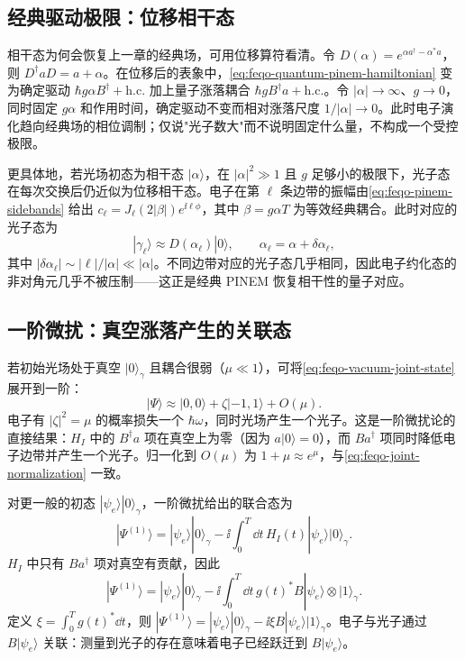 \subsection{经典驱动极限：位移相干态}

相干态为何会恢复上一章的经典场，可用位移算符看清。令 \(D(\alpha)=e^{\alpha a^\dagger-\alpha^*a}\)，则 \(D^\dagger aD=a+\alpha\)。在位移后的表象中，\cref{eq:feqo-quantum-pinem-hamiltonian} 变为确定驱动 \(\hbar g\alpha B^\dagger+\mathrm{h.c.}\) 加上量子涨落耦合 \(\hbar gB^\dagger a+\mathrm{h.c.}\)。令 \(|\alpha|\to\infty\)、\(g\to0\)，同时固定 \(g\alpha\) 和作用时间，确定驱动不变而相对涨落尺度 \(1/|\alpha|\to0\)。此时电子演化趋向经典场的相位调制；仅说"光子数大"而不说明固定什么量，不构成一个受控极限。

更具体地，若光场初态为相干态 \(|\alpha\rangle\)，在 \(|\alpha|^2\gg1\) 且 \(g\) 足够小的极限下，光子态在每次交换后仍近似为位移相干态。电子在第 \(\ell\) 条边带的振幅由\cref{eq:feqo-pinem-sidebands} 给出 \(c_\ell=J_\ell(2|\beta|)e^{\ii\ell\phi}\)，其中 \(\beta=g\alpha T\) 为等效经典耦合。此时对应的光子态为
\begin{equation}
|\gamma_\ell\rangle\approx D(\alpha_\ell)|0\rangle,\qquad
\alpha_\ell=\alpha+\delta\alpha_\ell,
\label{eq:feqo-classical-displaced}
\end{equation}
其中 \(|\delta\alpha_\ell|\sim|\ell|/|\alpha|\ll|\alpha|\)。不同边带对应的光子态几乎相同，因此电子约化态的非对角元几乎不被压制——这正是经典 PINEM 恢复相干性的量子对应。

\subsection{一阶微扰：真空涨落产生的关联态}

若初始光场处于真空 \(|0\rangle_\gamma\) 且耦合很弱（\(\mu\ll1\)），可将\cref{eq:feqo-vacuum-joint-state} 展开到一阶：
\begin{equation}
|\Psi\rangle\approx|0,0\rangle+\zeta|-1,1\rangle+O(\mu).
\label{eq:feqo-first-order-vacuum}
\end{equation}
电子有 \(|\zeta|^2=\mu\) 的概率损失一个 \(\hbar\omega\)，同时光场产生一个光子。这是一阶微扰论的直接结果：\(H_I\) 中的 \(B^\dagger a\) 项在真空上为零（因为 \(a|0\rangle=0\)），而 \(Ba^\dagger\) 项同时降低电子边带并产生一个光子。归一化到 \(O(\mu)\) 为 \(1+\mu\approx e^\mu\)，与\cref{eq:feqo-joint-normalization} 一致。

对更一般的初态 \(|\psi_e\rangle|0\rangle_\gamma\)，一阶微扰给出的联合态为
\begin{equation}
|\Psi^{(1)}\rangle=|\psi_e\rangle|0\rangle_\gamma
-\ii\int_0^T\dd t\,H_I(t)|\psi_e\rangle|0\rangle_\gamma.
\label{eq:feqo-first-order-general}
\end{equation}
\(H_I\) 中只有 \(Ba^\dagger\) 项对真空有贡献，因此
\begin{equation}
|\Psi^{(1)}\rangle=|\psi_e\rangle|0\rangle_\gamma
-\ii\int_0^T\dd t\,g(t)^*B|\psi_e\rangle\otimes|1\rangle_\gamma.
\label{eq:feqo-first-order-result}
\end{equation}
定义 \(\xi=\int_0^T g(t)^*\dd t\)，则 \(|\Psi^{(1)}\rangle=|\psi_e\rangle|0\rangle_\gamma-\ii\xi B|\psi_e\rangle|1\rangle_\gamma\)。电子与光子通过 \(B|\psi_e\rangle\) 关联：测量到光子的存在意味着电子已经跃迁到 \(B|\psi_e\rangle\)。

